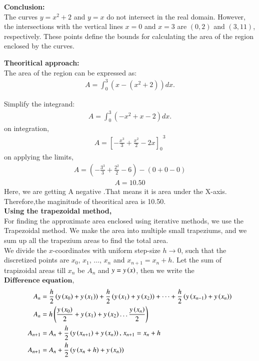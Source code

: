 \documentclass[article]{IEEEtran}
\numberwithin{figure}{enumi}
\begin{document}
\noindent\textbf{Conclusion:}\\
The curves $y = x^2 + 2$ and $y = x$ do not intersect in the real domain. However, the intersections with the vertical lines $x = 0$ and $x = 3$ are $(0, 2)$ and $(3, 11)$, respectively. These points define the bounds for calculating the area of the region enclosed by the curves.

\textbf{Theoritical approach: }\\
The area of the region can be expressed as:
\begin{align}
   A = \int_0^3 \left( x - (x^2 + 2) \right) dx. 
\end{align}

Simplify the integrand:
\begin{align}
A = \int_0^3 \left( -x^2 + x - 2 \right) dx.
\end{align}
on integration,
\begin{align}
    A={\left[-\frac{x^3}{3}+\frac{x^2}{2}-2x\right]_0}^3
\end{align}
on applying the limits,
\begin{align}
   A=(-\frac{3^3}{3}+\frac{2^2}{2}-6)-(0+0-0)
\end{align}
\begin{align}
    A=10.50
\end{align}
Here, we are getting A negative .That means it is area under the X-axis.
Therefore,the maginitude of theoritical area is 10.50.\\
\textbf{Using the trapezoidal method,}\\ 
For finding the approximate area enclosed using iterative methods, we use the Trapezoidal method. We make the area into multiple small trapeziums, and we sum up all the trapezium areas to find the total area. \\
We divide the $x$-coordinates with uniform step-size $h \to 0$, such that the discretized points are $x_0$, $x_1$, $\dots$, $x_n$ and $x_{n + 1} = x_n + h$.
\newline
Let the sum of trapizoidal areas till $x_n$ be $A_n$ and $y = y\left(x\right)$, then we write the $\textbf{Difference equation}$,
\begin{align}
    A_n &= \frac{h}{2}\left(y\left(x_0\right) + y\left(x_1\right)\right) + \frac{h}{2}\left(y\left(x_1\right) + y\left(x_2\right)\right) + \dots + \frac{h}{2}\left(y\left(x_{n - 1}\right) + y\left(x_{n}\right)\right)\\
    A_n &= h\left(\frac{y\left(x_0\right)}{2} + y\left(x_1\right) + y\left(x_2\right) \dots \frac{y\left(x_n\right)}{2}\right)\\
    A_{n + 1} &= A_n + \frac{h}{2}\left(y\left(x_{n + 1}\right) + y\left(x_n\right)\right) \text{, } x_{n + 1} = x_n + h\\
    A_{n + 1} &= A_n + \frac{h}{2}\left(y\left(x_n + h\right) + y\left(x_n\right)\right)\\
\end{align}
\end{document}
